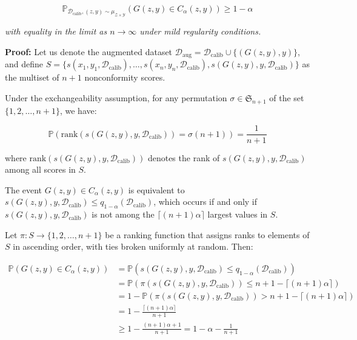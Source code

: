 \documentclass{article}
\theoremstyle{plain}
\theoremstyle{definition}
\theoremstyle{remark}
\begin{document}
\begin{equation}
\mathbb{P}_{\mathcal{D}_{\text{calib}}, (z,y) \sim \mu_{\mathcal{Z} \times \mathcal{Y}}}(G(z, y) \in C_{\alpha}(z, y)) \geq 1 - \alpha
\end{equation}

\textit{with equality in the limit as $n \rightarrow \infty$ under mild regularity conditions.}

\textbf{Proof:} Let us denote the augmented dataset $\mathcal{D}_{\text{aug}} = \mathcal{D}_{\text{calib}} \cup \{(G(z, y), y)\}$, and define $S = \{s(x_1, y_1, \mathcal{D}_{\text{calib}}), \ldots, s(x_n, y_n, \mathcal{D}_{\text{calib}}), s(G(z, y), y, \mathcal{D}_{\text{calib}})\}$ as the multiset of $n+1$ nonconformity scores.

Under the exchangeability assumption, for any permutation $\sigma \in \mathfrak{S}_{n+1}$ of the set $\{1, 2, \ldots, n+1\}$, we have:

\begin{equation}
\mathbb{P}(\text{rank}(s(G(z, y), y, \mathcal{D}_{\text{calib}})) = \sigma(n+1)) = \frac{1}{n+1}
\end{equation}

where $\text{rank}(s(G(z, y), y, \mathcal{D}_{\text{calib}}))$ denotes the rank of $s(G(z, y), y, \mathcal{D}_{\text{calib}})$ among all scores in $S$.

The event $G(z, y) \in C_{\alpha}(z, y)$ is equivalent to $s(G(z, y), y, \mathcal{D}_{\text{calib}}) \leq q_{1-\alpha}(\mathcal{D}_{\text{calib}})$, which occurs if and only if $s(G(z, y), y, \mathcal{D}_{\text{calib}})$ is not among the $\lceil (n+1) \alpha \rceil$ largest values in $S$.

Let $\pi: S \rightarrow \{1, 2, \ldots, n+1\}$ be a ranking function that assigns ranks to elements of $S$ in ascending order, with ties broken uniformly at random. Then:

\begin{align}
\mathbb{P}(G(z, y) \in C_{\alpha}(z, y)) &= \mathbb{P}(s(G(z, y), y, \mathcal{D}_{\text{calib}}) \leq q_{1-\alpha}(\mathcal{D}_{\text{calib}})) \\
&= \mathbb{P}(\pi(s(G(z, y), y, \mathcal{D}_{\text{calib}})) \leq n+1-\lceil (n+1) \alpha \rceil) \\
&= 1 - \mathbb{P}(\pi(s(G(z, y), y, \mathcal{D}_{\text{calib}})) > n+1-\lceil (n+1) \alpha \rceil) \\
&= 1 - \frac{\lceil (n+1) \alpha \rceil}{n+1} \\
&\geq 1 - \frac{(n+1) \alpha + 1}{n+1} = 1 - \alpha - \frac{1}{n+1}
\end{align}
\end{document}
